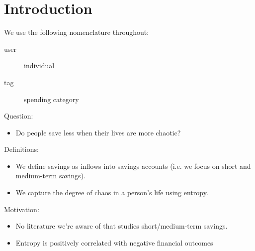 
\section{Introduction}%
\label{sec:introduction}

We use the following nomenclature throughout:
\begin{description}
    \item[user] individual
    \item[tag] spending category
\end{description}

Question:
\begin{itemize}
    \item Do people save less when their lives are more chaotic?
\end{itemize}

Definitions:
\begin{itemize}
    \item We define savings as inflows into savings accounts (i.e. we focus on
        short and medium-term savings).

    \item We capture the degree of chaos in a person's life using entropy.
\end{itemize}


Motivation:
\begin{itemize}
    \item No literature we're aware of that studies short/medium-term savings.

    \item Entropy is positively correlated with negative financial outcomes
        \citet{muggleton2020evidence}
\end{itemize}







